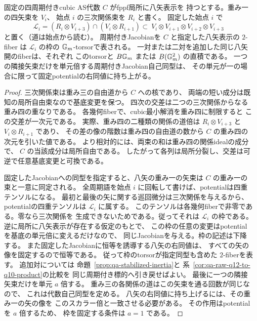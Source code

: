 \begin{corollary}[八矢表示fiberと張り合わせ関係の線束]
\label{cor:qa-eight-potential-line-fiber}
固定の四周期付きcubic AS代数 $C$ がfppf局所に八矢表示を
持つとする。重み一の四矢束を $V_i$、
始点 $i$ の三次関係束を $R_i$ と書く。
固定した始点 $i$ で
\[
 \mathcal L_i =
   (R_i\otimes V_{i+3})\cap (V_i\otimes R_{i+1})
   \subset\ V_i\otimes V_{i+1}\otimes V_{i+2}\otimes V_{i+3}
\]
と置く（道は始点から読む）。
周期付きJacobianを $C$ と指定した八矢表示の $2$-fiber は
$\mathcal L_i$ の枠の $\mathbb G_m$-torsorで表される。
一対または二対を追加した同じ八矢開のfiberは、それぞれ
このtorsorと $B\mathbb G_m$ または $B(\mathbb G_m^2)$ の直積である。
一つの隣接矢束だけを単元倍する周期付きJacobian自己同型は、
その単元が一の場合に限って固定potentialの右同値に持ち上がる。
\end{corollary}
\begin{proof}
三次関係束は重み三の自由道から $C$ への核であり、
両端の短い成分は既知の局所自由束なので基底変更を保つ。
四次の交差は二つの三次関係からなる重み四の重なりである。
各幾何fiberで、cubic最小解消を重み四に制限すると
この交差が一次元である。
実際、重み四の二種類の関係の道倍は
$R_i\otimes V_{i+3}$ と $V_i\otimes R_{i+1}$ であり、
その差の像の階数は重み四の自由道の数から
$C$ の重み四の次元を引いた値である。
より相対的には、両束の和は重み四の関係idealの成分で、
$C$ の当該成分は局所自由である。
したがって各列は局所分裂し、交差は可逆で任意基底変更と可換である。

固定したJacobianへの同型を指定すると、八矢の重み一の矢束は
$C$ の重み一の束と一意に同定される。
全周期語を始点 $i$ に回転して書けば、potentialは四重テンソルになる。
最初と最後の矢に関する巡回微分は三次関係を与えるから、
potentialの四重テンソルは $\mathcal L_i$ に属する。
このテンソルは各幾何fiberで非零である。零なら三次関係を
生成できないためである。従ってそれは $\mathcal L_i$ の枠である。
逆に局所に八矢表示が存在する仮定のもとで、
この枠の任意の変更はpotentialを基底の単元倍に変えるだけなので、
同じJacobianを与える。枠の記述は下降する。
また固定したJacobianに恒等を誘導する八矢の右同値は、
すべての矢の像を固定するので恒等である。
従って枠のtorsorが指定同型も含めた $2$-fiberを表す。
追加対については
命題~\ref{prop:qa-stabilized-inertia}と
系~\ref{cor:qa-raw-q12-to-q10-product}の比較を
同じ周期付き標的へ引き戻せばよい。
最後に一つの隣接矢束だけを単元 $a$ 倍する。
重み三の各関係の道はこの矢束を通る回数が同じなので、
これは代数自己同型を定める。
八矢の右同値に持ち上げるには、その重み一の矢の像を
このスカラー倍と一致させる必要がある。
その作用はpotentialを $a$ 倍するため、
枠を固定する条件は $a=1$ である。
\end{proof}

